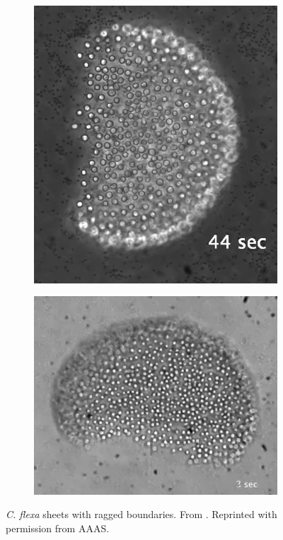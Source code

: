 \begin{figure}
	\centering
	\begin{subfigure}[b]{0.48\textwidth}
		\centering
		\includegraphics[height=\textwidth,angle=90]{edges1.png}
		\caption{}
		\label{subfig:edges1}
	\end{subfigure}
	\begin{subfigure}[b]{0.48\textwidth}
		\centering
		\includegraphics[width=\textwidth]{edges2.png}
		\caption{}
		\label{subfig:edges2}
	\end{subfigure}
	\caption[\textit{C. flexa} sheets with ragged boundaries]{\textit{C. flexa} sheets with ragged boundaries. From \citet{brunet2019}. Reprinted with permission from AAAS.}
	\label{fig:edges}
\end{figure}

